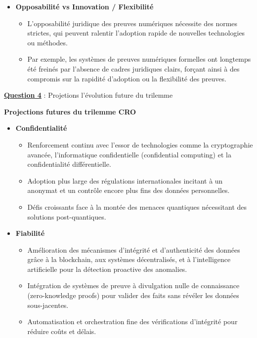 \documentclass[12pt, a4paper]{article}
\newcommand{\question}[1]{\textbf{\underline{Question #1}}}
\begin{document}
\begin{enumerate}[label=\textbf{\arabic*.}, start=3]
\begin{itemize}
			\item \textbf{Opposabilité vs Innovation / Flexibilité}
			\begin{itemize}
				\item L'opposabilité juridique des preuves numériques nécessite des normes strictes, qui peuvent ralentir l'adoption rapide de nouvelles technologies ou méthodes.
				\item Par exemple, les systèmes de preuves numériques formelles ont longtemps été freinés par l'absence de cadres juridiques clairs, forçant ainsi à des compromis sur la rapidité d'adoption ou la flexibilité des preuves.
			\end{itemize}
		\end{itemize}
		
		\question{4} : Projetions l'évolution future du trilemme
		
		\textbf{Projections futures du trilemme CRO}
		
		\begin{itemize}
			\item \textbf{Confidentialité}
			\begin{itemize}
				\item Renforcement continu avec l'essor de technologies comme la cryptographie avancée, l'informatique confidentielle (confidential computing) et la confidentialité différentielle.
				\item Adoption plus large des régulations internationales incitant à un anonymat et un contrôle encore plus fins des données personnelles.
				\item Défis croissants face à la montée des menaces quantiques nécessitant des solutions post-quantiques.
			\end{itemize}
			
			\item \textbf{Fiabilité}
			\begin{itemize}
				\item Amélioration des mécanismes d'intégrité et d'authenticité des données grâce à la blockchain, aux systèmes décentralisés, et à l'intelligence artificielle pour la détection proactive des anomalies.
				\item Intégration de systèmes de preuve à divulgation nulle de connaissance (zero-knowledge proofs) pour valider des faits sans révéler les données sous-jacentes.
				\item Automatisation et orchestration fine des vérifications d'intégrité pour réduire coûts et délais.
			\end{itemize}
			

\end{itemize}
\end{enumerate}
\end{document}
